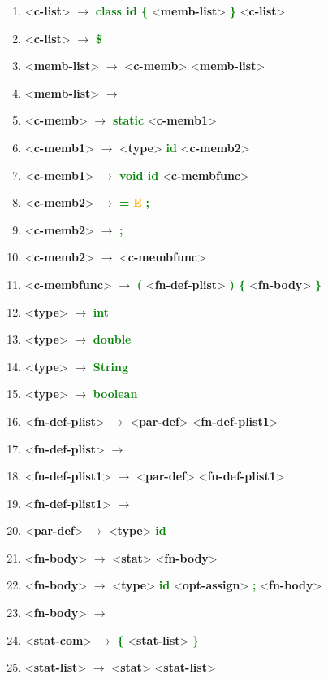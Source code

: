\documentclass[a4paper, 11pt]{article}
\providecommand{\nonterm}[1]{\textless \textbf{#1}\textgreater}
\providecommand{\term}[1]{\textcolor{Green}{\textbf{#1}}}
\providecommand{\arrow}{ $\rightarrow$ }
\providecommand{\E}{ \textcolor{Orange}{\textbf{E}}}
\providecommand{\eps}{ \textcolor{Red}{\textbf{\textepsilon}}}
\begin{document}
    \begin{enumerate}[itemsep=0mm]
        \item\nonterm{c-list}\arrow\term{class id \{ }\nonterm{memb-list}\term{ \}}       \nonterm{c-list}
        \item\nonterm{c-list}\arrow\term{\$}
        \item\nonterm{memb-list}\arrow\nonterm{c-memb} \nonterm{memb-list}
        \item\nonterm{memb-list}\arrow \eps
        \item\nonterm{c-memb}\arrow\term{static} \nonterm{c-memb1}
        \item\nonterm{c-memb1}\arrow\nonterm{type} \term{id} \nonterm{c-memb2}
        \item\nonterm{c-memb1}\arrow\term{void id} \nonterm{c-membfunc}
        \item\nonterm{c-memb2}\arrow\term{= }\E\term{ ;}
        \item\nonterm{c-memb2}\arrow\term{;}
        \item\nonterm{c-memb2}\arrow\nonterm{c-membfunc}
        \item\nonterm{c-membfunc}\arrow\term{(} \nonterm{fn-def-plist} \term{) \{} \nonterm{fn-body} \term{\}}
        \item\nonterm{type}\arrow\term{int}
        \item\nonterm{type}\arrow\term{double}
        \item\nonterm{type}\arrow\term{String}
        \item\nonterm{type}\arrow\term{boolean}
        \item\nonterm{fn-def-plist}\arrow\nonterm{par-def} \nonterm{fn-def-plist1}
        \item\nonterm{fn-def-plist}\arrow\eps
        \item\nonterm{fn-def-plist1}\arrow\nonterm{par-def} \nonterm{fn-def-plist1}
        \item\nonterm{fn-def-plist1}\arrow\eps
        \item\nonterm{par-def}\arrow\nonterm{type} \term{id}
        \item\nonterm{fn-body}\arrow\nonterm{stat} \nonterm{fn-body}
        \item\nonterm{fn-body}\arrow\nonterm{type} \term{id} \nonterm{opt-assign} \term{;} \nonterm{fn-body}
        \item\nonterm{fn-body}\arrow\eps
        \item\nonterm{stat-com}\arrow\term{\{} \nonterm{stat-list} \term{\}}
        \item\nonterm{stat-list}\arrow\nonterm{stat} \nonterm{stat-list}

\end{enumerate}
\end{document}
